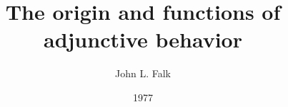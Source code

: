 \documentclass[a4paper,12pt]{article}
\title{The origin and functions of adjunctive behavior}
\author{John L. Falk}
\date{1977}
\begin{document}
{\scshape\bfseries \maketitle}
\end{document}
